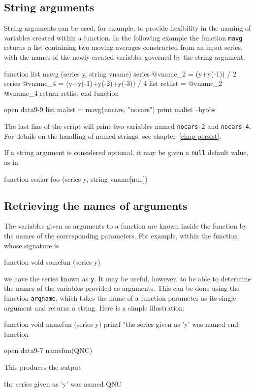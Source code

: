 \subsection{String arguments}

String arguments can be used, for example, to provide flexibility in
the naming of variables created within a function.  In the following
example the function \texttt{mavg} returns a list containing two
moving averages constructed from an input series, with the names of
the newly created variables governed by the string argument.
%
\begin{code}
function list mavg (series y, string vname)
   series @vname_2 = (y+y(-1)) / 2
   series @vname_4 = (y+y(-1)+y(-2)+y(-3)) / 4
   list retlist = @vname_2 @vname_4
   return retlist
end function

open data9-9
list malist = mavg(nocars, "nocars")
print malist --byobs
\end{code}
%
The last line of the script will print two variables named
\verb|nocars_2| and \verb|nocars_4|.  For details on the handling of
named strings, see chapter~\ref{chap-persist}.

If a string argument is considered optional, it may be given a
\texttt{null} default value, as in
%
\begin{code}
function scalar foo (series y, string vname[null])
\end{code}

\subsection{Retrieving the names of arguments}

The variables given as arguments to a function are known inside the
function by the names of the corresponding parameters.  For example,
within the function whose signature is
%
\begin{code}
function void somefun (series y)
\end{code}
%
we have the series known as \texttt{y}.  It may be useful, however, to
be able to determine the names of the variables provided as arguments.
This can be done using the function \texttt{argname}, which takes the
name of a function parameter as its single argument and returns a
string.  Here is a simple illustration:
%
\begin{code}
function void namefun (series y)
  printf "the series given as 'y' was named %
end function

open data9-7
namefun(QNC)
\end{code}
%
This produces the output
%
\begin{code}
the series given as 'y' was named QNC
\end{code}


